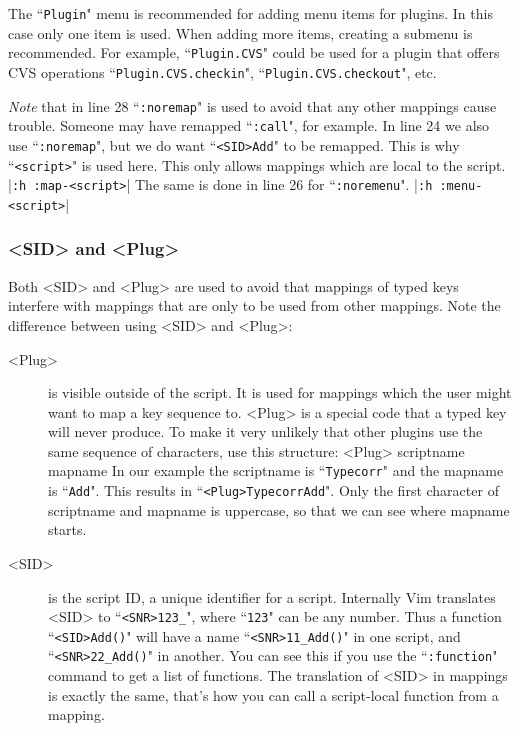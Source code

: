 The ``\texttt{Plugin}" menu is recommended for adding menu items for plugins.
In this case only one item is used.
When adding more items, creating a submenu is recommended.
For example, ``\texttt{Plugin.CVS}" could be used for a plugin that offers CVS operations ``\texttt{Plugin.CVS.checkin}", ``\texttt{Plugin.CVS.checkout}", etc.

\emph{Note} that in line 28 ``\texttt{:noremap}" is used to avoid that any other mappings cause trouble.
Someone may have remapped ``\texttt{:call}", for example.
In line 24 we also use ``\texttt{:noremap}", but we do want ``\texttt{<SID>Add}" to be remapped.
This is why ``\texttt{<script>}" is used here.
This only allows mappings which are local to the script. |\texttt{:h :map-<script>}|
The same is done in line 26 for ``\texttt{:noremenu}".
|\texttt{:h :menu-<script>}|

\subsubsection{<SID> and <Plug>}
\label{using-<Plug>}
Both <SID> and <Plug> are used to avoid that mappings of typed keys interfere with mappings that are only to be used from other mappings.
Note the difference between using <SID> and <Plug>:

\begin{description}
				\item [<Plug>]    is visible outside of the script.
								It is used for mappings which the user might want to map a key sequence to.
								<Plug> is a special code that a typed key will never produce.
								To make it very unlikely that other plugins use the same sequence of characters, use this structure: <Plug> scriptname mapname In our example the scriptname is ``\texttt{Typecorr}" and the mapname is ``\texttt{Add}".
								This results in ``\texttt{<Plug>TypecorrAdd}".
								Only the first character of scriptname and mapname is uppercase, so that we can see where mapname starts.

				\item [<SID>]  is the script ID, a unique identifier for a script.
								Internally Vim translates <SID> to ``\texttt{<SNR>123\_}", where ``\texttt{123}" can be any number.
								Thus a function ``\texttt{<SID>Add()}" will have a name ``\texttt{<SNR>11\_Add()}" in one script, and ``\texttt{<SNR>22\_Add()}" in another.
								You can see this if you use the ``\texttt{:function}" command to get a list of functions.
								The translation of <SID> in mappings is exactly the same, that's how you can call a script-local function from a mapping.
\end{description}


